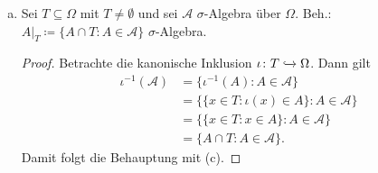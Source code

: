 \documentclass[uebung]{lecture}
\begin{document}
\begin{aufgabe}
\begin{enumerate}[(a)]
            Beh.: $f^{-1}(\mathcal{A}) \coloneqq \{ f^{-1}(A) \colon A \in \mathcal{A}\} $ ist $\sigma$-Algebra.
            \begin{proof}
                \begin{enumerate}[(i)]
                    \item $\mathcal{X} \in f^{-1}(\mathcal{A})$, denn $f^{-1}(\Omega) = \mathcal{X}$.
                    \item Sei $B \in f^{-1}(\mathcal{A})$. Dann ex. ein $A \in \mathcal{A}$, s.d.
                        $f^{-1}(A) = B$. Da $\mathcal{A}$ $\sigma$-Algebra ist $A^{c} \in \mathcal{A}$.
                        Damit folgt
                        \[
                            B^{c} = f^{-1}(A)^{c} = f^{-1}(A^{c}) \in f^{-1}(\mathcal{A})
                        .\]
                    \item Seien $B_i \in f^{-1}(\mathcal{A})$ $\forall i \in \N$. Dann ex. $\forall i \in \N$
                        ein $A_i \in \mathcal{A}$, s.d. $f^{-1}(A_i) = B_i$. Da
                        $\mathcal{A}$ $\sigma$-Algebra ist $\bigcup_{i \in \N} A_i \in \mathcal{A}$.
                        Damit folgt
                        \[
                            \bigcup_{i \in \N} B_i = \bigcup_{i \in \N} f^{-1}(A_i)
                            = f^{-1} \left( \bigcup_{i \in \N} A_i \right) \in f^{-1}(\mathcal{A})
                        .\] 
                \end{enumerate}
            \end{proof}
        \item Sei $T \subseteq \Omega$ mit $T \neq \emptyset$ und sei $\mathcal{A}$ $\sigma$-Algebra über
            $\Omega$. Beh.: $A|_T \coloneqq \{ A \cap T \colon A \in \mathcal{A}\} $ $\sigma$-Algebra.
            \begin{proof}
                Betrachte die kanonische Inklusion $\iota \colon T \xhookrightarrow{} \Omega$. Dann
                gilt
                \begin{align*}
                    \iota^{-1}(\mathcal{A}) &= \{ \iota^{-1}(A) \colon A \in \mathcal{A}\} \\
                    &= \{ \{ x \in T \colon \iota(x) \in A \} \colon A \in \mathcal{A}\} \\
                    &= \{ \{ x \in T \colon x \in A \} \colon A \in \mathcal{A}\} \\
                    &= \{ A \cap T \colon A \in \mathcal{A}\} 
                .\end{align*}
                Damit folgt die Behauptung mit (c).
            \end{proof}
    \end{enumerate}
\end{aufgabe}
\end{document}
